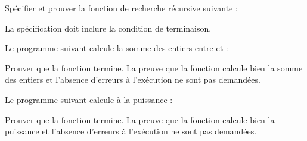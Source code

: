 

Spécifier et prouver la fonction de recherche récursive suivante :




La spécification doit inclure la condition de terminaison.




Le programme suivant calcule la somme des entiers entre  et
 :




Prouver que la fonction termine. La preuve que la fonction calcule bien la
somme des entiers et l'absence d'erreurs à l'exécution ne sont pas demandées.




Le programme suivant calcule  à la puissance  :




Prouver que la fonction termine. La preuve que la fonction calcule bien la
puissance et l'absence d'erreurs à l'exécution ne sont pas demandées.
